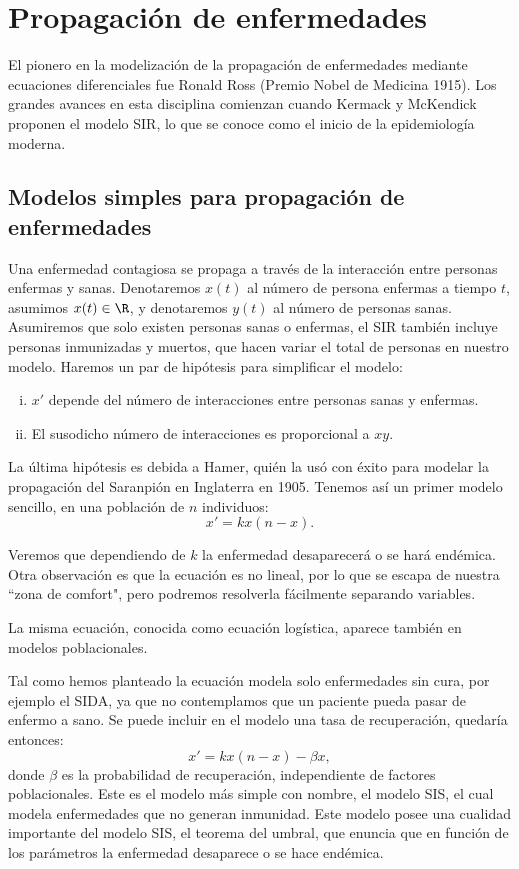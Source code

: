 \documentclass[../main.tex]{subfiles}
\begin{document}
\section{Propagación de enfermedades}

El pionero en la modelización de la propagación de enfermedades mediante
ecuaciones diferenciales fue Ronald Ross (Premio Nobel de Medicina 1915). Los 
grandes avances en esta disciplina comienzan cuando Kermack y McKendick
proponen el modelo SIR, lo que se conoce como el inicio de la epidemiología
moderna.

\subsection{Modelos simples para propagación de enfermedades}

Una enfermedad contagiosa se propaga a través de la interacción entre personas
enfermas y sanas. Denotaremos \(x(t)\) al número de persona enfermas a tiempo 
\(t\), asumimos \(x(t) \in \R\), y denotaremos \(y(t)\) al número de personas
sanas. Asumiremos que solo existen personas sanas o enfermas, el SIR también
incluye personas inmunizadas y muertos, que hacen variar el total de personas en
nuestro modelo. Haremos un par de hipótesis para simplificar el modelo:
\begin{enumerate}[i)]
	\item \(x'\) depende del número de interacciones entre personas sanas y 
		enfermas.

	\item El susodicho número de interacciones es proporcional a \(xy\).
\end{enumerate}

La última hipótesis es debida a Hamer, quién la usó con éxito para modelar
la propagación del Saranpión en Inglaterra en 1905. Tenemos así un primer
modelo sencillo, en una población de \(n\) individuos:
\[x' = k x(n - x).\]

Veremos que dependiendo de \(k\) la enfermedad desaparecerá o se hará endémica. 
Otra observación es que la ecuación es no lineal, por lo que se escapa de
nuestra ``zona de comfort", pero podremos resolverla fácilmente separando
variables.

\begin{remark}
	La misma ecuación, conocida como ecuación logística, aparece también en
	modelos poblacionales.
\end{remark}

Tal como hemos planteado la ecuación modela solo enfermedades sin cura, por
ejemplo el SIDA, ya que no contemplamos que un paciente pueda pasar de enfermo a
sano. Se puede incluir en el modelo una tasa de recuperación, quedaría entonces:
\[x' = k x(n - x) - \beta x,\]
donde \(\beta\) es la probabilidad de recuperación, independiente de factores
poblacionales. Este es el modelo más simple con nombre, el modelo SIS, el cual
modela enfermedades que no generan inmunidad. Este modelo posee una cualidad
importante del modelo SIS, el teorema del umbral, que enuncia que en función de 
los parámetros la enfermedad desaparece o se hace endémica.
\end{document}
